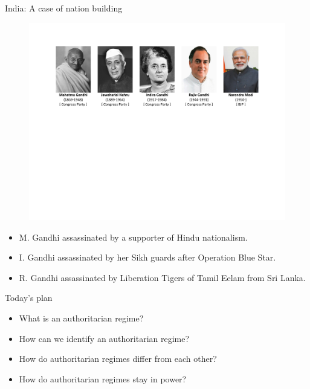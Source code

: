 \documentclass[10pt]{beamer}
\begin{document}
\begin{frame}{India: A case of nation building}
	\begin{figure}
	\centering
	\includegraphics[scale=0.5]{Figs/India/leaders}
	\end{figure}
	\pause
	\begin{itemize}
	\item M. Gandhi assassinated by a supporter of Hindu nationalism.
	\item I. Gandhi assassinated by her Sikh guards after Operation Blue Star.
	\item R. Gandhi assassinated by Liberation Tigers of Tamil Eelam from Sri Lanka.
	\end{itemize}
\end{frame}

\begin{frame}{Today's plan}
	\begin{itemize}
		\item What is an authoritarian regime?
		\item How can we identify an authoritarian regime?
		\item How do authoritarian regimes differ from each other?
		\item How do authoritarian regimes stay in power?
	\end{itemize}
\end{frame}
\end{document}
